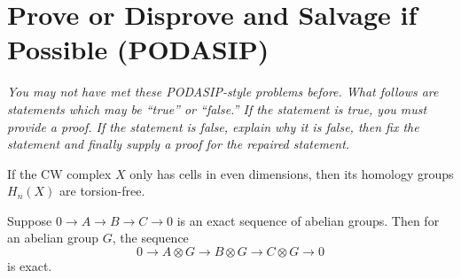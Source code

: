 \documentclass{homework}
\begin{document}
\section{Prove or Disprove and Salvage if Possible (PODASIP)}

\textit{You may not have met these PODASIP-style problems before.
  What follows are statements which may be ``true'' or ``false.''  If
  the statement is true, you must provide a proof.  If the statement
  is false, explain why it is false, then fix the statement and
  finally supply a proof for the repaired statement.}

\begin{problem} If the CW complex $X$ only has cells in even
dimensions, then its homology groups $H_n(X)$ are torsion-free.
\end{problem}

\begin{problem} Suppose $0 \to A \to B \to C \to 0$ is an exact
sequence of abelian groups.  Then for an abelian group $G$, the
sequence
  \[
    0 \to A \otimes G \to B \otimes G \to C \otimes G \to 0
    \] is exact.
\end{problem}
\end{document}
